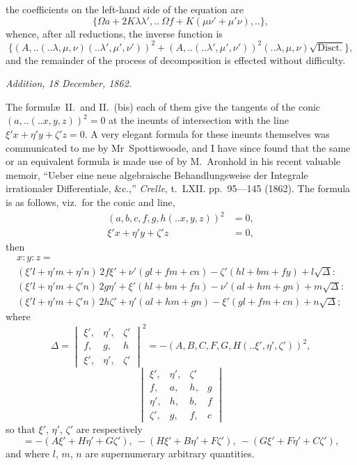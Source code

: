 \documentclass[12pt,a4paper]{article}
\newcommand{\qform}[2]{(#1 \mathbin{..} #2)}
\theoremstyle{definition}
\begin{document}
the coefficients on the left-hand side of the equation are
\[
\{\Omega a + 2K\lambda\lambda',..\ \Omega f + K(\mu\nu' + \mu'\nu),..\},
\]
whence, after all reductions, the inverse function is
\[
\{(A,..\!\qform{}{\lambda, \mu, \nu}\!\qform{}{\lambda', \mu', \nu'})^{2}
+ (A,..\!\qform{}{\lambda', \mu', \nu'})^{2}\!\qform{}{\lambda, \mu, \nu}
\sqrt{\text{Disct.}}\},
\]
and the remainder of the process of decomposition is effected without difficulty.

\medskip
\begin{center}
\textit{Addition, 18 December, 1862.}
\end{center}

The formul\ae\ II.\ and II.\ (bis) each of them give the tangents of the conic
$(a,..\!\qform{}{x, y, z})^{2} = 0$ at the ineunts of intersection with the line
$\xi'x + \eta'y + \zeta'z = 0$. A very elegant formula for these ineunts themselves
was communicated to me by Mr~Spottiswoode, and I have since found that the same or
an equivalent formula is made use of by M.~Aronhold in his recent valuable memoir,
``Ueber eine neue algebraische Behandlungsweise der Integrale irrationaler
Differentiale, \&c.,'' \textit{Crelle}, t.~LXII. pp.~95---145 (1862). The formula is as
follows, viz.\ for the conic and line,
\begin{align*}
(a, b, c, f, g, h\!\qform{}{x, y, z})^{2} &= 0,\\
\xi'x + \eta'y + \zeta'z &= 0,
\end{align*}
then
\begin{multline*}
x : y : z =\\
(\xi'l + \eta'm + \eta'n)\,2f\xi' + \nu'(gl + fm + cn) - \zeta'(hl + bm + fy) + l\sqrt{\Delta} :\\
(\xi'l + \eta'm + \zeta'n)\,2g\eta' + \xi'(hl + bm + fn) - \nu'(al + hm + gn) + m\sqrt{\Delta} :\\
(\xi'l + \eta'm + \zeta'n)\,2h\zeta' + \eta'(al + hm + gn) - \xi'(gl + fm + cn) + n\sqrt{\Delta};
\end{multline*}
where
\[
\Delta =
\begin{vmatrix}
\xi', & \eta', & \zeta'\\
f, & g, & h\\
\xi', & \eta', & \zeta'
\end{vmatrix}^{2}
= -(A, B, C, F, G, H\!\qform{}{\xi', \eta', \zeta'})^{2},
\]
\[
\begin{vmatrix}
\xi', & \eta', & \zeta'\\
f, & a, & h, & g\\
\eta', & h, & b, & f\\
\zeta', & g, & f, & c
\end{vmatrix}
\]
so that $\xi'$, $\eta'$, $\zeta'$ are respectively
\[
= -(A\xi' + H\eta' + G\zeta'),\ -(H\xi' + B\eta' + F\zeta'),\ -(G\xi' + F\eta' + C\zeta'),
\]
and where $l$, $m$, $n$ are supernumerary arbitrary quantities.
\end{document}
